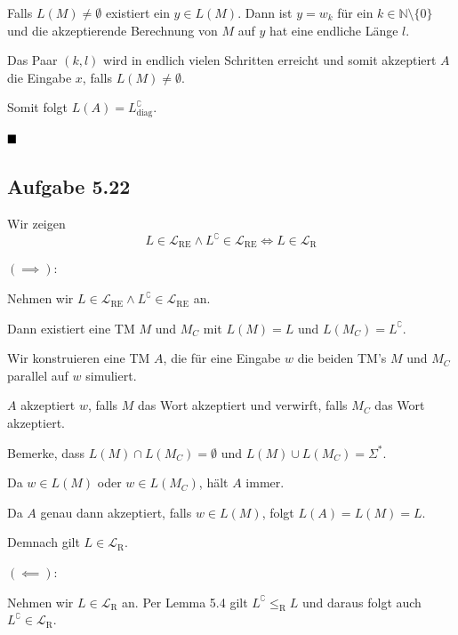 \documentclass[a4paper, 11pt]{article}
\def\N{\mathbb{N}}
\def\Lre{\mathcal{L}_\text{RE}}
\def\Lr{\mathcal{L}_\text{R}}
\begin{document}
                    Falls $L(M) \neq \emptyset$ existiert ein $y \in L(M)$. Dann ist $y = w_k$ für ein $k \in \N\setminus\{0\}$ und die akzeptierende Berechnung von $M$ auf $y$ hat eine endliche Länge $l$.
                
                    Das Paar $(k, l)$ wird in endlich vielen Schritten erreicht und somit akzeptiert $A$ die Eingabe $x$, falls $L(M) \neq \emptyset$.
                
                    Somit folgt $L(A) = L_{\text{diag}}^\complement$.
                
                    $\hfill\blacksquare$
                
                
                
                    \subsection{Aufgabe 5.22}
                    Wir zeigen
                    $$L \in \Lre \land L^\complement \in \Lre \iff L \in \Lr$$
                
                    $\mathbf{(\implies):}$
                    
                    Nehmen wir $L \in \Lre \land L^\complement \in \Lre$ an.
                
                    Dann existiert eine TM $M$ und $M_C$ mit $L(M) = L$ und $L(M_C) = L^\complement$.
                
                    Wir konstruieren eine TM $A$, die für eine Eingabe $w$ die beiden TM's $M$ und $M_C$ parallel auf $w$ simuliert.
                    
                    $A$ akzeptiert $w$, falls $M$ das Wort akzeptiert und verwirft, falls $M_C$ das Wort akzeptiert.
                    
                    Bemerke, dass $L(M) \cap L(M_C) = \emptyset$ und $L(M) \cup L(M_C) = \Sigma^*$.
                
                    Da $w \in L(M)$ oder $w \in L(M_C)$, hält $A$ immer.
                
                    Da $A$ genau dann akzeptiert, falls $w \in L(M)$, folgt $L(A) = L(M) = L$.
                
                    Demnach gilt $L \in \Lr$.
                
                    
                    $\mathbf{(\impliedby):}$
                
                    Nehmen wir $L \in \Lr$ an. Per Lemma 5.4 gilt $L^\complement \leq_{\text{R}} L$ und daraus folgt auch $L^\complement \in \Lr$.
                
\end{document}
